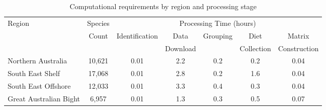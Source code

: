 \begin{table}[htbp]
    \centering
    \footnotesize
    \caption{Computational requirements by region and processing stage}
    \label{tab:timing_analysis}
    \begin{tabular}{lcccccc}
    \hline
    Region & Species & \multicolumn{5}{c}{Processing Time (hours)} \\
    \cline{3-7}
     & Count & Identification & Data & Grouping & Diet & Matrix \\
     & & & Download & & Collection & Construction \\
    \hline
    Northern Australia & 10,621 & 0.01 & 2.2 & 0.2 & 0.2 & 0.04 \\
    South East Shelf & 17,068 & 0.01 & 2.8 & 0.2 & 1.6 & 0.04 \\
    South East Offshore & 12,033 & 0.01 & 3.3 & 0.4 & 0.3 & 0.04 \\
    Great Australian Bight & 6,957 & 0.01 & 1.3 & 0.3 & 0.5 & 0.07 \\
    \hline
    \end{tabular}
    \vspace{1ex}
    \end{table}
    

